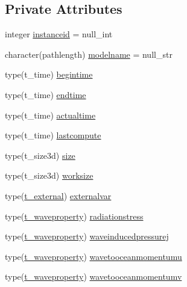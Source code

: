 \subsection*{Private Attributes}
\begin{DoxyCompactItemize}
\item 
integer \mbox{\hyperlink{structmodulewaves_1_1t__waves_ae3460d1619a04b41f18d3ecb6050884e}{instanceid}} = null\+\_\+int
\item 
character(pathlength) \mbox{\hyperlink{structmodulewaves_1_1t__waves_afa1ee08931c954e9e1ed3c30f71fc656}{modelname}} = null\+\_\+str
\item 
type(t\+\_\+time) \mbox{\hyperlink{structmodulewaves_1_1t__waves_af7622d82c936e5c73058519612b39286}{begintime}}
\item 
type(t\+\_\+time) \mbox{\hyperlink{structmodulewaves_1_1t__waves_a820ff69f525e36d8ce575ad3e8e358d5}{endtime}}
\item 
type(t\+\_\+time) \mbox{\hyperlink{structmodulewaves_1_1t__waves_a731a0fb6bbd6a571d5e7e7a06031e568}{actualtime}}
\item 
type(t\+\_\+time) \mbox{\hyperlink{structmodulewaves_1_1t__waves_add201a987dea58cfdf3fb3fb6c17616e}{lastcompute}}
\item 
type(t\+\_\+size3d) \mbox{\hyperlink{structmodulewaves_1_1t__waves_a12e6c39d43f777ded3fc5063e6bf3e89}{size}}
\item 
type(t\+\_\+size3d) \mbox{\hyperlink{structmodulewaves_1_1t__waves_ab07a8a5fa71176808b6c53c38db7b34c}{worksize}}
\item 
type(\mbox{\hyperlink{structmodulewaves_1_1t__external}{t\+\_\+external}}) \mbox{\hyperlink{structmodulewaves_1_1t__waves_afc70d94e61765e3ab1cd8711fc056fe0}{externalvar}}
\item 
type(\mbox{\hyperlink{structmodulewaves_1_1t__waveproperty}{t\+\_\+waveproperty}}) \mbox{\hyperlink{structmodulewaves_1_1t__waves_a8ad4f3d77134b2b08e86b0b8bb057f6f}{radiationstress}}
\item 
type(\mbox{\hyperlink{structmodulewaves_1_1t__waveproperty}{t\+\_\+waveproperty}}) \mbox{\hyperlink{structmodulewaves_1_1t__waves_a403290f55b8308ee18d38baa1d94e02b}{waveinducedpressurej}}
\item 
type(\mbox{\hyperlink{structmodulewaves_1_1t__waveproperty}{t\+\_\+waveproperty}}) \mbox{\hyperlink{structmodulewaves_1_1t__waves_a8c5a1503d8b20a4c7d626fe4b213fcd1}{wavetooceanmomentumu}}
\item 
type(\mbox{\hyperlink{structmodulewaves_1_1t__waveproperty}{t\+\_\+waveproperty}}) \mbox{\hyperlink{structmodulewaves_1_1t__waves_a4eb289d17e7bb33965ac7c86e7ea31f1}{wavetooceanmomentumv}}

\end{DoxyCompactItemize}
